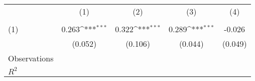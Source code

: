 {
\def\sym#1{\ifmmode^{#1}\else\(^{#1}\)\fi}
\begin{tabular}{l*{4}{c}}
\hline\hline
                    &\multicolumn{1}{c}{(1)}&\multicolumn{1}{c}{(2)}&\multicolumn{1}{c}{(3)}&\multicolumn{1}{c}{(4)}\\
                    &\multicolumn{1}{c}{} &\multicolumn{1}{c}{} &\multicolumn{1}{c}{} &\multicolumn{1}{c}{} \\
\hline
(1)                 &       0.263\sym{***}&       0.322\sym{***}&       0.289\sym{***}&      -0.026         \\
                    &     (0.052)         &     (0.106)         &     (0.044)         &     (0.049)         \\
\hline
Observations        &                     &                     &                     &                     \\
\(R^{2}\)           &                     &                     &                     &                     \\
\hline\hline
\end{tabular}
}
